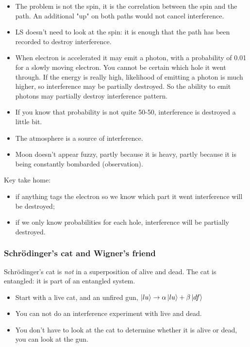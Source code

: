 \documentclass[]{article}
\begin{document}
\begin{itemize}
	\item The problem is not the spin, it is the correlation between the spin and the path. An additional "up" on both paths would not cancel interference.
	\item LS doesn't need to look at the spin: it is enough that the path has been recorded to destroy interference.
	\item When electron is accelerated it may emit a photon, with a probability of 0.01 for a slowly moving electron. You cannot be certain which hole it went through. If the energy is really high, likelihood of emitting a photon is much higher, so interference may be partially destroyed. So the ability to emit photons may partially destroy interference pattern. 
	\item If you know that probability is not quite 50-50, interference is destroyed a little bit.
	\item The atmosphere is a source of interference.
	\item Moon doesn't appear fuzzy, partly because it is heavy, partly because it is being constantly bombarded (observation).
\end{itemize}

Key take home: \begin{itemize}
	\item if anything tags the electron so we know which part it went interference will be destroyed;
	\item if we only know probabilities for each hole, interference will be partially destroyed.
\end{itemize}

\subsubsection{Schr\"odinger's cat and Wigner's friend}

Schr\"odinger's cat is \emph{not} in a superposition of alive and dead. The cat is entangled: it is part of an entangled system.
\begin{itemize}
	\item Start with a live cat, and an unfired gun, $\ket{lu}\rightarrow\alpha\ket{lu}+\beta\ket{df}$
	\item You can not do an interference experiment with live and dead.
	\item You don't have to look at the cat to determine whether it is alive or dead, you can look at the gun.
\end{itemize}
\end{document}
